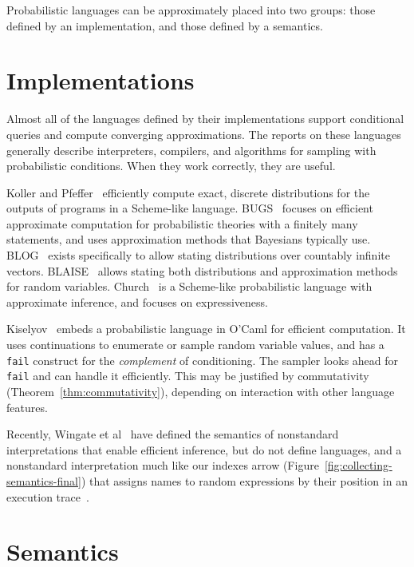 Probabilistic languages can be approximately placed into two groups: those defined by an implementation, and those defined by a semantics.

\section{Implementations}

Almost all of the languages defined by their implementations support conditional queries and compute converging approximations.
The reports on these languages generally describe interpreters, compilers, and algorithms for sampling with probabilistic conditions.
When they work correctly, they are useful.

Koller and Pfeffer~\cite{cit:koller-1997aaai-bayes-programs-short} efficiently compute exact, discrete distributions for the outputs of programs in a Scheme-like language.
BUGS~\cite{cit:winbugs-language-short} focuses on efficient approximate computation for probabilistic theories with a finitely many statements, and uses approximation methods that Bayesians typically use.
BLOG~\cite{cit:blog-language-short} exists specifically to allow stating distributions over countably infinite vectors.
BLAISE~\cite{cit:blaise-language} allows stating both distributions and approximation methods for random variables.
Church~\cite{cit:church-language-short} is a Scheme-like probabilistic language with approximate inference, and focuses on expressiveness.

Kiselyov~\cite{cit:kiselyov-2008uai-monolingual} embeds a probabilistic language in O'Caml for efficient computation.
It uses continuations to enumerate or sample random variable values, and has a \texttt{fail} construct for the \textit{complement} of conditioning.
The sampler looks ahead for \texttt{fail} and can handle it efficiently.
This may be justified by commutativity (Theorem~\ref{thm:commutativity}), depending on interaction with other language features.

Recently, Wingate et al~\cite{cit:wingate-2011nips-nonstandard} have defined the semantics of nonstandard interpretations that enable efficient inference, but do not define languages, and a nonstandard interpretation much like our indexes arrow (Figure~\ref{fig:collecting-semantics-final}) that assigns names to random expressions by their position in an execution trace~\cite{cit:wingate-2011ais-lightweight}.

\section{Semantics}

